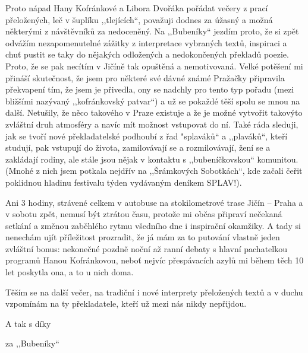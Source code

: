 Proto nápad Hany Kofránkové a Libora Dvořáka pořádat večery z prací přeložených, leč v šuplíku ,,tlejících``, považuji dodnes za úžasný a možná některými z návštěvníků za nedoceněný. Na ,,Bubeníky`` jezdím  proto, že si zpět odvážím nezapomenutelné zážitky z interpretace vybraných textů, inspiraci a chuť pustit se taky do nějakých odložených  a nedokončených překladů poezie. Proto, že se pak necítím v Jičíně tak opuštěná a nemotivovaná. Velké potěšení mi přináší skutečnost, že jsem pro některé své dávné známé Pražačky připravila překvapení tím, že jsem je přivedla, ony se nadchly pro tento typ pořadu (mezi bližšími nazývaný ,,kofránkovský patvar``) a už se pokaždé těší spolu se mnou na další. Netušily, že něco takového v Praze existuje a že je možné vytvořit takovýto zvláštní druh atmosféry a navíc mít možnost vstupovat do ní. Také ráda sleduji, jak se tvoří nové překladatelské podhoubí z  řad "splaváků`` a ,,plaváků``, kteří studují, pak vstupují do života, zamilovávají se a rozmilovávají, žení se a zakládají rodiny, ale stále jsou nějak v kontaktu s ,,bubeníčkovskou`` komunitou. (Mnohé z nich jsem potkala nejdřív na ,,Šrámkových Sobotkách``, kde začali čeřit poklidnou hladinu festivalu týden vydávaným deníkem SPLAV!). 

Ani 3 hodiny, strávené celkem v autobuse na stokilometrové trase Jičín -- Praha a v sobotu zpět, nemusí být ztrátou času, protože mi občas připraví nečekaná setkání a změnou zaběhlého rytmu všedního dne i inspirační okamžiky. A tady si nenechám ujít příležitost prozradit, že já mám za to putování vlastně jeden zvláštní bonus: nekonečné pozdně noční až ranní debaty s hlavní pachatelkou programů Hanou Kofránkovou, neboť nejvíc přespávacích azylů mi během těch 10 let poskytla ona, a to u nich doma.

Těším se na další večer, na tradiční i nové interprety přeložených textů a v duchu vzpomínám na ty překladatele, kteří už mezi nás nikdy nepřijdou. 

\medskip

\noindent
A tak s díky

\hspace*{1cm}za ,,Bubeníky``

